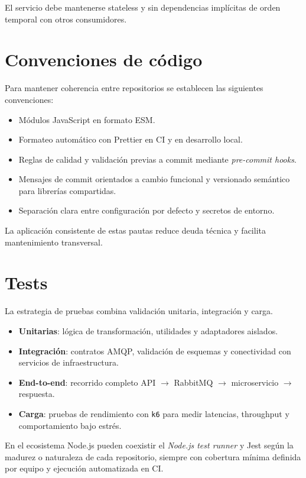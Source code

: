 El servicio debe mantenerse stateless y sin dependencias implícitas de orden temporal con otros consumidores.

\section{Convenciones de código}

Para mantener coherencia entre repositorios se establecen las siguientes convenciones:

\begin{itemize}
\item Módulos JavaScript en formato ESM.
\item Formateo automático con Prettier en CI y en desarrollo local.
\item Reglas de calidad y validación previas a commit mediante \textit{pre-commit hooks}.
\item Mensajes de commit orientados a cambio funcional y versionado semántico para librerías compartidas.
\item Separación clara entre configuración por defecto y secretos de entorno.
\end{itemize}

La aplicación consistente de estas pautas reduce deuda técnica y facilita mantenimiento transversal.

\section{Tests}

La estrategia de pruebas combina validación unitaria, integración y carga.

\begin{itemize}
\item \textbf{Unitarias}: lógica de transformación, utilidades y adaptadores aislados.
\item \textbf{Integración}: contratos AMQP, validación de esquemas y conectividad con servicios de infraestructura.
\item \textbf{End-to-end}: recorrido completo API $\rightarrow$ RabbitMQ $\rightarrow$ microservicio $\rightarrow$ respuesta.
\item \textbf{Carga}: pruebas de rendimiento con \texttt{k6} para medir latencias, throughput y comportamiento bajo estrés.
\end{itemize}

En el ecosistema Node.js pueden coexistir el \textit{Node.js test runner} y Jest según la madurez o naturaleza de cada repositorio, siempre con cobertura mínima definida por equipo y ejecución automatizada en CI.
